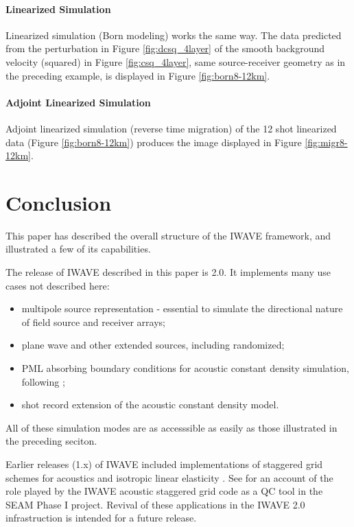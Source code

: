 {\noindent \paragraph{Linearized Simulation}
Linearized simulation (Born modeling) works the same way. The data
predicted from the perturbation in Figure \ref{fig:dcsq_4layer} of the smooth
background velocity (squared) in Figure \ref{fig:csq_4layer}, same
source-receiver geometry as in the preceding example, is displayed in
Figure \ref{fig:born8-12km}.

\noindent \paragraph{Adjoint Linearized Simulation}
Adjoint linearized simulation (reverse time migration) of the 12 shot
linearized data (Figure \ref{fig:born8-12km}) produces the image
displayed in Figure \ref{fig:migr8-12km}. 

\section{Conclusion}
This paper has described the overall structure of the IWAVE framework,
and illustrated a few of its capabilities. 

The release of IWAVE described in this paper is 2.0. It implements many use
cases not described here:  
\begin{itemize}
\item multipole source representation - essential to simulate the
  directional nature of field source and receiver arrays;
\item plane wave and other extended sources, including randomized;
\item PML absorbing boundary conditions for acoustic constant density
  simulation, following \cite{GrotePML:10};
\item shot record extension of the acoustic constant density model.
  \cite[]{KerSy:94}
\end{itemize}
All of these simulation modes are as accesssible as easily as those
illustrated in the preceding seciton.

Earlier releases (1.x) of IWAVE included implementations of staggered
grid schemes for acoustics and isotropic linear elasticity
\cite[]{moczoetal:06}. See  \cite{FehlerKeliher:11} for an account of
the role played by the IWAVE acoustic staggered grid code as a QC tool
in the SEAM Phase I project. Revival 
of these applications in the IWAVE 2.0 infrastruction is intended
for a future release.

}
